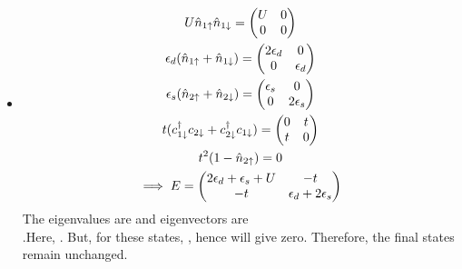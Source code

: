 \documentclass[12pt]{article}
\begin{document}
\subsection{}
\begin{itemize}
    \item {}
	\begin{gather}
	    U\hat n_{1\uparrow}\hat n_{1\downarrow}=\begin{pmatrix} U & 0 \\ 0 & 0 \end{pmatrix}\\
	    \epsilon_d(\hat n_{1\uparrow}+\hat n_{1\downarrow})=\begin{pmatrix} 2\epsilon_d & 0 \\ 0 & \epsilon_d\end{pmatrix}\\
	\epsilon_s(\hat n_{2\uparrow}+\hat n_{2\downarrow})=\begin{pmatrix} \epsilon_s & 0 \\ 0 & 2\epsilon_s\end{pmatrix}\\
	t(c_{1\downarrow}^\dagger c_{2\downarrow}+c_{2\downarrow}^\dagger c_{1\downarrow})=\begin{pmatrix} 0 & t \\ t & 0\end{pmatrix}\\
	    t^2(1-\hat n_{2\uparrow})=0\\
	    \implies E= \begin{pmatrix} 2\epsilon_d+\epsilon_s+U & -t \\ -t & \epsilon_d+2\epsilon_s\end{pmatrix}
	\end{gather}
	The eigenvalues are  and eigenvectors are \\.Here, \il{\eta \propto \cd^\dagger\ca}. But, for these states, , hence \il{\cd^\dagger} will give zero. Therefore, the final states remain unchanged.


\end{itemize}
\end{document}
